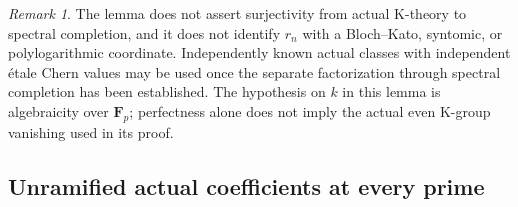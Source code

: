 \documentclass[11pt,a4paper]{amsart}
\numberwithin{equation}{section}
\theoremstyle{definition}
\theoremstyle{remark}
\newtheorem{remark}[theorem]{Remark}
\begin{document}
\begin{remark}
The lemma does not assert surjectivity from actual K-theory to
spectral completion, and it does not identify $r_n$ with a
Bloch--Kato, syntomic, or polylogarithmic coordinate. Independently
known actual classes with independent \'etale Chern values may be
used once the separate factorization through spectral completion
has been established. The hypothesis on $k$ in this lemma is
algebraicity over $\mathbf F_p$; perfectness alone does not imply
the actual even K-group vanishing used in its proof.
\end{remark}


\subsection{Unramified actual coefficients at every prime}
\label{d3:sec:unramifiedhighercoefficients}
\end{document}
